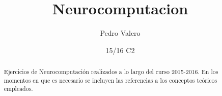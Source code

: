 \documentclass[nochap,palatino]{apuntes}
\title{Neurocomputacion}
\author{Pedro Valero}
\date{15/16 C2}
\begin{document}
\pagestyle{plain}

\begin{abstract}
Ejercicios de Neurocomputación realizados a lo largo del curso 2015-2016. En los momentos en que es necesario se incluyen las referencias a los conceptos teóricos empleados.
\end{abstract}

\maketitle

\tableofcontents
\newpage

\appendix


\printindex
\end{document}
